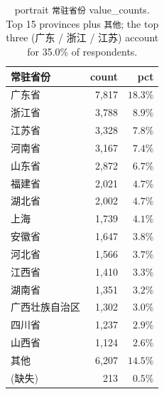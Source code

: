\documentclass[11pt,letterpaper,english,final]{article}
\begin{document}
\begin{table}[H]
\centering
\small
\setlength{\tabcolsep}{6pt}
\caption{portrait \texttt{常驻省份} value\_counts. Top 15 provinces plus \texttt{其他}; the top three (广东 / 浙江 / 江苏) account for 35.0\% of respondents.}
\label{tab:province}
\begin{tabular}{@{}l r r@{}}
\toprule
{常驻省份} & {count} & {pct} \\
\midrule
广东省        & 7{,}817 & $18.3\%$ \\
浙江省        & 3{,}788 & $8.9\%$  \\
江苏省        & 3{,}328 & $7.8\%$  \\
河南省        & 3{,}167 & $7.4\%$  \\
山东省        & 2{,}872 & $6.7\%$  \\
福建省        & 2{,}021 & $4.7\%$  \\
湖北省        & 2{,}002 & $4.7\%$  \\
上海          & 1{,}739 & $4.1\%$  \\
安徽省        & 1{,}647 & $3.8\%$  \\
河北省        & 1{,}566 & $3.7\%$  \\
江西省        & 1{,}410 & $3.3\%$  \\
湖南省        & 1{,}351 & $3.2\%$  \\
广西壮族自治区 & 1{,}302 & $3.0\%$  \\
四川省        & 1{,}237 & $2.9\%$  \\
山西省        & 1{,}124 & $2.6\%$  \\
其他          & 6{,}207 & $14.5\%$ \\
\midrule
(缺失)        & 213    & $0.5\%$ \\
\bottomrule
\end{tabular}
\end{table}
\end{document}
